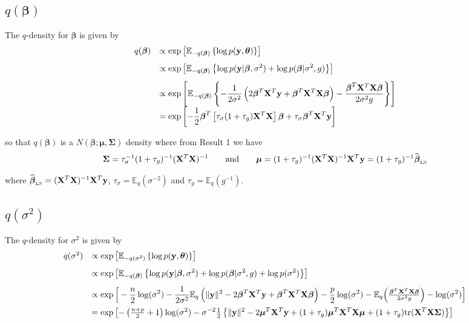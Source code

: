 \documentclass{article}
\def\vectorfontone{\bf}
\def\vectorfonttwo{\boldsymbol}
\def\vy{{\vectorfontone y}}                      %
\def\vbeta{{\vectorfonttwo \beta}}               %
\def\vtheta{{\vectorfonttwo \theta}}             %
\def\vmu{{\vectorfonttwo \mu}}                   %
\def\matrixfontone{\bf}
\def\matrixfonttwo{\boldsymbol}
\def\mX{{\matrixfontone X}}                      %
\def\mSigma{{\matrixfonttwo \Sigma}}             %
\def\bE{{\mathbb E}}                             %
\def\ds{\displaystyle}
\begin{document}
\subsection{$q(\vbeta)$}

\noindent The $q$-density for $\vbeta$ is given by
$$
\begin{array}{rl}
\ds q(\vbeta)
& \ds \propto \exp\left[ \bE_{-q(\vbeta)} \left\{ \log p(\vy,\vtheta) \right\} \right]
\\ [2ex]
& \ds \propto \exp\left[ \bE_{-q(\vbeta)} \left\{  \log p(\vy|\vbeta,\sigma^2) 
+ \log p(\vbeta|\sigma^2,g) 
\right\} \right]
\\ [2ex]
& \ds \propto \exp\left[ \bE_{-q(\vbeta)} \left\{ - \frac{1}{2\sigma^2}\left( 
2\vbeta^T\mX^T\vy + \vbeta^T\mX^T\mX\vbeta \right)  - \frac{\vbeta^T\mX^T\mX\vbeta}{2\sigma^2 g} \right\} \right]
\\ [2ex]
& \ds =\exp\left[
-\frac{1}{2}\vbeta^T\left[ \tau_\sigma(1 + \tau_g)\mX^T\mX \right]\vbeta
+ \tau_\sigma\vbeta^T\mX^T\vy
\right] 
\end{array}
$$

\noindent so that $q(\vbeta)$ is a $N(\vbeta;\vmu,\mSigma)$ density where from Result 1 we have
$$
\mSigma = \tau_\sigma^{-1}(1 + \tau_g)^{-1}(\mX^T\mX)^{-1}
\qquad \mbox{and} \qquad 
\vmu 
= (1 + \tau_g)^{-1}(\mX^T\mX)^{-1}\mX^T\vy 
= (1 + \tau_g)^{-1}\widehat{\vbeta}_{\mbox{\tiny LS}}
$$

\noindent where $\widehat{\vbeta}_{\mbox{\tiny LS}} = (\mX^T\mX)^{-1}\mX^T\vy$,
$\tau_\sigma = \bE_q(\sigma^{-2})$ and
$\tau_g = \bE_q(g^{-1})$.

\subsection{$q(\sigma^2)$}

\noindent The $q$-density for $\sigma^2$ is given by
$$
\begin{array}{rl}
q(\sigma^2) 
& \ds \propto \exp\left[ \bE_{-q(\sigma^2)} \left\{ \log p(\vy,\vtheta) \right\} \right]
\\ [2ex]
& \ds \propto \exp\left[ \bE_{-q(\vbeta)} \left\{  \log p(\vy|\vbeta,\sigma^2) 
+ \log p(\vbeta|\sigma^2,g)
+ \log p(\sigma^2) \right\} \right]
\\ [2ex]
& \ds \propto
\exp\Big[
- \frac{n}{2}\log(\sigma^2) 
- \frac{1}{2\sigma^2}\bE_q\left(
\|\vy\|^2  - 2\vbeta^T\mX^T\vy + \vbeta^T\mX^T\mX\vbeta \right)
- \frac{p}{2}\log(\sigma^2) 
- \bE_q\Big( \tfrac{\vbeta^T\mX^T\mX\vbeta}{2\sigma^2 g}\Big)
- \log(\sigma^2) 
\Big]
\\ [2ex]
& \ds =
\exp\left[
- \left( \tfrac{n+p}{2} + 1 \right)\log(\sigma^2)
- \sigma^{-2}\tfrac{1}{2}\left\{
\|\vy\|^2 
- 2\vmu^T\mX^T\vy 
+ (1 + \tau_g)\vmu^T\mX^T\mX\vmu  
+ (1 + \tau_g)\mbox{tr}(\mX^T\mX\mSigma)
\right\}
\right]
\end{array}
$$
\end{document}
